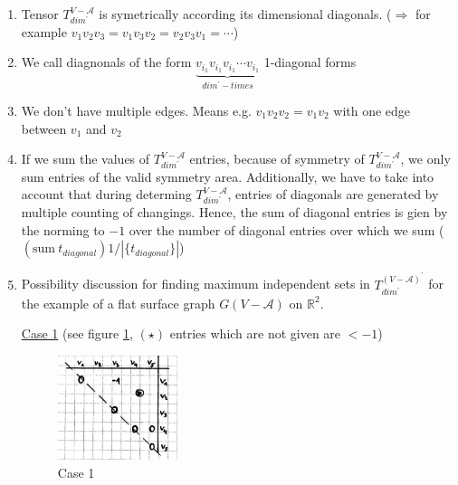 \documentclass{article}
\newtheorem*{theorem A}{Theorem A}
\newtheorem*{theorem B}{N\"olker's Theorem}
\theoremstyle{remark}
\theoremstyle{remark}
\begin{document}
\begin{enumerate}
    \item Tensor $T^{V - \mathcal{A}}_{dim^{\prime}}$ is symetrically according its dimensional diagonals. ($\Rightarrow$ for example $v_{1}v_{2}v_{3} = v_{1}v_{3}v_{2} = v_{2}v_{3}v_{1} = \cdots$)

    \item We call diagnonals of the form $\underbrace{v_{i_{1}} v_{i_{1}} v_{i_{1}} \cdots v_{i_{1}}}_{dim^{\prime}-times}$ 1-diagonal forms

    \item We don't have multiple edges. Means e.g. $v_{1}v_{2}v_{2} = v_{1}v_{2}$ with one edge between $v_{1}$ and $v_{2}$

    \item If we sum the values of $T^{V - \mathcal{A}}_{dim^{\prime}}$ entries, because of symmetry of $T^{V - \mathcal{A}}_{dim^{\prime}}$, we only sum entries of the valid symmetry area. Additionally, we have to take into account that during determing $T^{V - \mathcal{A}}_{dim^{\prime}}$, entries of diagonals are generated by multiple counting of changings. Hence, the sum of diagonal entries is gien by the norming to $-1$ over the number of diagonal entries over which we sum ($\left( \mathrm{sum} \ t_{diagonal}\right) 1/|\{ t_{diagonal} \} |$)

    \item Possibility discussion for finding maximum independent sets in $T^{\left(V - \mathcal{A}\right)^{\prime}}_{dim^{\prime}}$ for the example of a flat surface graph $G\left(V - \mathcal{A}\right)$ on $\mathbb{R}^{2}$.


    \vspace{0.3cm}
    \underline{Case 1} (see figure \ref{fig:case1}, $\left(\star\right)$ entries which are not given are $< -1$)\\

    \begin{figure}[ht]
	    \centering
        \includegraphics[width=0.33\textwidth]{images/case1.png}
	    \caption{Case 1}
	\label{fig:case1}
    \end{figure}


\end{enumerate}
\end{document}
